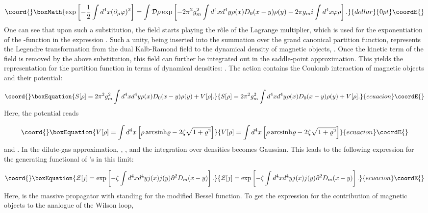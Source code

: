 \documentclass[a4paper,12pt]{article}
\begin{document}
$$\coord{}\boxMath{\exp\left[-\frac12\int d^4x(\partial_\mu\varphi)^2\right]=
\int {\cal D}\rho\exp\left[-2\pi^2g_m^2\int d^4xd^4y\rho(x)D_0(x-y)\rho(y)
-2\pi g_m i\int d^4x\varphi\rho\right].}{dollar}{0pt}\coordE{}$$
One can see that upon such a substitution, the field \myHighlight{$\varphi$}\coordHE{} starts playing the r\^ole of the 
Lagrange multiplier, which is used for the exponentiation of the \myHighlight{$\delta$}\coordHE{}-function in the 
expression \coordHE{}. Such a unity, being inserted into the 
summation over the grand canonical partition function, represents the Legendre transformation from 
the dual Kalb-Ramond field \myHighlight{$\varphi$}\coordHE{} to the dynamical density of magnetic objects, \myHighlight{$\rho$}\coordHE{}.
Once the kinetic term of the field \myHighlight{$\varphi$}\coordHE{} is removed by the above substitution, this field
can further be integrated out in the saddle-point approximation. This yields the 
representation for the partition function \coordHE{}
in terms of dynamical densities: \coordHE{}.
The action \coordHE{} contains the Coulomb interaction of magnetic objects and their potential:

\begin{equation}\coord{}\boxEquation{
\label{srho}
S[\rho]=2\pi^2g_m^2\int d^4xd^4y\rho(x)D_0(x-y)\rho(y)+V[\rho].
}{
S[\rho]=2\pi^2g_m^2\int d^4xd^4y\rho(x)D_0(x-y)\rho(y)+V[\rho].
}{ecuacion}\coordE{}\end{equation}
Here, the potential reads

\begin{equation}\coord{}\boxEquation{
\label{5}
V[\rho]=\int d^4x\left[\rho{\,}{\rm arcsinh}
\varrho-
2\zeta\sqrt{1+\varrho^2}\right] 
}{
V[\rho]=\int d^4x\left[\rho{\,}{\rm arcsinh}
\varrho-
2\zeta\sqrt{1+\varrho^2}\right] 
}{ecuacion}\coordE{}\end{equation}
and \myHighlight{$\varrho\equiv\rho/(2\zeta)$}\coordHE{}.
In the dilute-gas approximation, \myHighlight{$|\rho|\ll\zeta$}\coordHE{}, \coordHE{}, and 
the integration over densities becomes Gaussian. This leads to the following expression  
for the generating functional of \myHighlight{$\rho$}\coordHE{}'s in this limit:

\begin{equation}\coord{}\boxEquation{
\label{gf}
{\cal Z}[j]=\exp\left[-\zeta\int d^4xd^4yj(x)j(y)\partial^2D_m(x-y)\right].
}{
{\cal Z}[j]=\exp\left[-\zeta\int d^4xd^4yj(x)j(y)\partial^2D_m(x-y)\right].
}{ecuacion}\coordE{}\end{equation}
Here, \coordHE{} is the massive propagator with \coordHE{} standing 
for the modified Bessel function. To get the expression for the contribution of magnetic objects to the analogue of the 
Wilson loop, 
\end{document}

